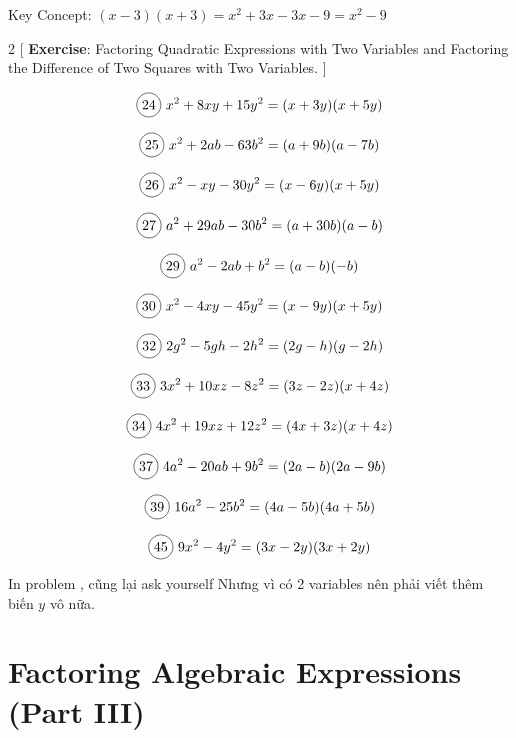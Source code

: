 Key Concept: $(x-3)(x+3)=x^{2}+3x-3x-9=x^{2}-9$

\vspace{.6cm}

\begin{multicols}{2}
[
  \textbf{Exercise}: Factoring Quadratic Expressions with Two Variables and Factoring the Difference of Two Squares with Two Variables.
]

\begin{align*}
  \circled{24}\ x^{2}+8xy+15y^{2}=(x+3y)(x+5y)
\end{align*}

  \[\circled{25}\ x^{2}+2ab-63b^{2}=(a+9b)(a-7b)\]

  \[\circled{26}\ x^{2}-xy-30y^{2}=(x-6y)(x+5y)\]

  \[\circled{27}\ a^{2}+29ab-30b^{2}=(a+30b)(a-b)\]

  \[\circled{29}\ a^{2}-2ab+b^{2}=(a-b)(-b)\]

  \[\circled{30}\ x^{2}-4xy-45y^{2}=(x-9y)(x+5y)\]

  \[\circled{32}\ 2g^{2}-5gh-2h^{2}=(2g-h)(g-2h)\]

  \[\circled{33}\ 3x^{2}+10xz-8z^{2}=(3z-2z)(x+4z)\]

  \[\circled{34}\ 4x^{2}+19xz+12z^{2}=(4x+3z)(x+4z)\]

  \[\circled{37}\ 4a^{2}-20ab+9b^{2}=(2a-b)(2a-9b)\]

  \[\circled{39}\ 16a^{2}-25b^{2}=(4a-5b)(4a+5b)\]

  \[\circled{45}\ 9x^{2}-4y^{2}=(3x-2y)(3x+2y)\]
\end{multicols}

In problem , cũng lại ask yourself  Nhưng vì có 2 variables nên phải viết thêm biến $y$ vô nữa.

\section{Factoring Algebraic Expressions (Part III)}

